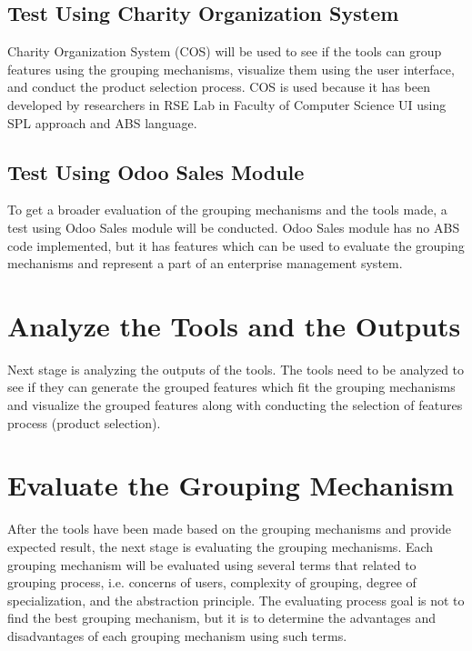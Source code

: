 	\subsection{Test Using Charity Organization System}
	Charity Organization System (COS) will be used to see if the tools can group features using the grouping mechanisms, visualize them using the user interface, and conduct the product selection process. COS is used because it has been developed by researchers in RSE Lab in Faculty of Computer Science UI using SPL approach and ABS language.
	
	\subsection{Test Using Odoo Sales Module}
	To get a broader evaluation of the grouping mechanisms and the tools made, a test using Odoo Sales module will be conducted. Odoo Sales module has no ABS code implemented, but it has features which can be used to evaluate the grouping mechanisms and represent a part of an enterprise management system.

\section{Analyze the Tools and the Outputs}
Next stage is analyzing the outputs of the tools. The tools need to be analyzed to see if they can generate the grouped features which fit the grouping mechanisms and visualize the grouped features along with conducting the selection of features process (product selection).

\section{Evaluate the Grouping Mechanism}
After the tools have been made based on the grouping mechanisms and provide expected result, the next stage is evaluating the grouping mechanisms. Each grouping mechanism will be evaluated using several terms that related to grouping process, i.e. concerns of users, complexity of grouping, degree of specialization, and the abstraction principle. The evaluating process goal is not to find the best grouping mechanism, but it is to determine the advantages and disadvantages of each grouping mechanism using such terms.


